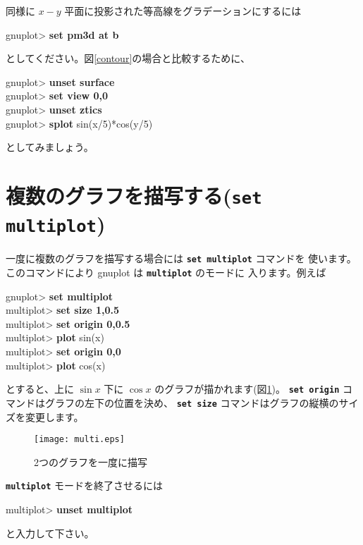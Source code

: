 \documentclass[a4j]{ujarticle} %
\newenvironment{terminal}{%
  \begin{center}
   \begin{minipage}{.8\textwidth}
    \setlength{\FrameSep}{.5\FrameSep}%
    \begin{framed}\ttfamily\small%
     \setlength\baselineskip{.85\baselineskip}%
}{%
    \end{framed}
   \end{minipage}
  \end{center}%
}
\begin{document}
同様に $x-y$ 平面に投影された等高線をグラデーションにするには
\begin{terminal}
gnuplot> {\bf set pm3d at b}
\end{terminal}
としてください。図\ref{contour}の場合と比較するために、
\begin{terminal}
gnuplot> {\bf unset surface}\\
 gnuplot> {\bf set view 0,0} \\
 gnuplot> {\bf unset ztics} \\
 gnuplot> {\bf splot} sin(x/5)*cos(y/5)
\end{terminal}
としてみましょう。

\section{複数のグラフを描写する({\tt\bf set multiplot})}
一度に複数のグラフを描写する場合には {\tt\bf set multiplot} コマンドを
使います。このコマンドにより gnuplot は {\tt\bf multiplot} のモードに
入ります。例えば
\begin{terminal}
gnuplot> {\bf set multiplot} \\
multiplot> {\bf set size 1,0.5} \\
multiplot> {\bf set origin 0,0.5} \\
 multiplot> {\bf plot} sin(x) \\
 multiplot> {\bf set origin 0,0} \\
 multiplot> {\bf plot} cos(x)
\end{terminal}
とすると、上に $\sin x$ 下に $\cos x$ のグラフが描かれます(図\ref{multi})。
{\tt\bf set origin} コマンドはグラフの左下の位置を決め、
{\tt\bf set size} コマンドはグラフの縦横のサイズを変更します。

\begin{figure}
\begin{center}
\begin{minipage}[hbtp]{0.49\textwidth}
\texttt{[image: multi.eps]}
\caption{2つのグラフを一度に描写}
\label{multi}
\end{minipage}
\end{center}
\end{figure}

{\bf\tt multiplot} モードを終了させるには
\begin{terminal}
multiplot> {\bf unset multiplot}
\end{terminal}
と入力して下さい。
\end{document}
